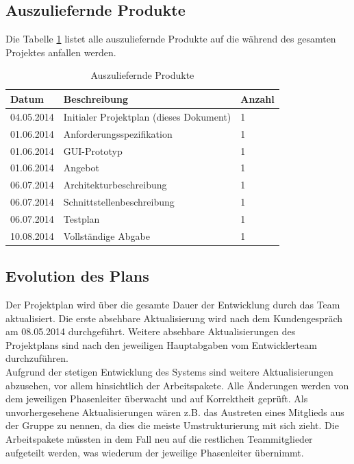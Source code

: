 \documentclass[fontsize=12pt,paper=a4,twoside]{scrartcl}
\begin{document}
\newpage

\subsection{Auszuliefernde Produkte\\}

Die Tabelle \ref{reqProd} listet alle auszuliefernde Produkte auf die während des gesamten Projektes anfallen werden.

\begin{table}[htbp]
\caption{Auszuliefernde Produkte}
\label{reqProd}
\centering
\begin{tabular}{|p{4cm}|p{8cm}|p{2cm}|}
\hline Datum & Beschreibung & Anzahl\\ \hline
\hline 04.05.2014 & Initialer Projektplan (dieses Dokument) & 1\\
\hline 01.06.2014 & Anforderungsspezifikation & 1\\
\hline 01.06.2014 & GUI-Prototyp & 1\\
\hline 01.06.2014 & Angebot & 1\\
\hline 06.07.2014 & Architekturbeschreibung & 1\\
\hline 06.07.2014 & Schnittstellenbeschreibung & 1\\
\hline 06.07.2014 & Testplan & 1\\
\hline 10.08.2014 & Vollständige Abgabe & 1\\
\hline 
\end{tabular}
\end{table}

\subsection{Evolution des Plans}

Der Projektplan wird über die gesamte Dauer der Entwicklung durch das Team aktualisiert. Die erste absehbare Aktualisierung wird nach dem Kundengespräch am 08.05.2014 durchgeführt. Weitere absehbare Aktualisierungen des Projektplans sind nach den jeweiligen Hauptabgaben vom Entwicklerteam durchzuführen. \\
Aufgrund der stetigen Entwicklung des Systems sind weitere Aktualisierungen abzusehen, vor allem hinsichtlich der Arbeitspakete. Alle Änderungen werden von dem jeweiligen Phasenleiter überwacht und auf Korrektheit geprüft. Als unvorhergesehene Aktualisierungen wären z.B. das Austreten eines Mitglieds aus der Gruppe zu nennen, da dies die meiste Umstrukturierung mit sich zieht. Die Arbeitspakete müssten in dem Fall neu auf die restlichen Teammitglieder aufgeteilt werden, was wiederum der jeweilige Phasenleiter übernimmt.
\end{document}
